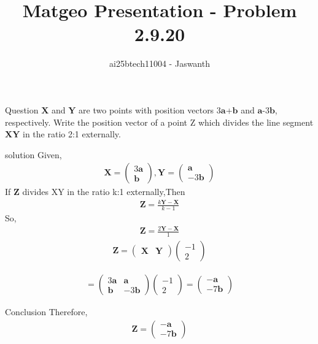 \documentclass{beamer}
\title{Matgeo Presentation - Problem 2.9.20}
\author{ai25btech11004 - Jaswanth}
\numberwithin{equation}{section}
\theoremstyle{remark}
\newcommand{\myvec}[1]{\ensuremath{\begin{pmatrix}#1\end{pmatrix}}}
\let\vec\mathbf
\begin{document}
\frame{\titlepage}
\begin{frame}{Question}
$\vec{X}$ and  $\vec{Y}$ are two points with position vectors $3\vec{a}$+$\vec{b}$  and  $\vec{a}$-$3\vec{b}$, respectively. Write the position vector of a point Z  which divides the line segment  $\vec{XY}$ in the ratio 2:1 externally.\\
\end{frame}
\begin{frame}{solution}
 Given,
\begin{align}
    \vec{X}=\myvec{3\vec{a}\\[6pt]
    \vec{b}} ,\vec{Y}=\myvec{\vec{a}\\[6pt]
                        -3\vec{b}}
\end{align}
If $\vec{Z}$ divides XY in the ratio k:1 externally,Then
\begin{align}
\vec{Z} = \frac{k\vec{Y} - \vec{X}}{k-1}
\end{align}
So,
\begin{align}
 \vec{Z} = \frac{2\vec{Y} - \vec{X}}{1}   
\end{align}
\begin{align}
\vec{Z} = \myvec{\vec{X} & \vec{Y} }
\myvec{-1 \\[6pt]
2}
\end{align}


\begin{align}
    =
\myvec{3\vec{a} & \vec{a} \\[6pt]
\vec{b} & -3\vec{b}}
\myvec{-1 \\[6pt]
2}
=
\myvec{-\vec{a} \\[6pt]
-7\vec{b}}
\end{align}
\end{frame}
\begin{frame}{Conclusion}
Therefore,
\begin{align}
    \vec{Z}=\myvec{-\vec{a} \\[6pt]
-7\vec{b}}
\end{align}
   
\end{frame}
\end{document}
